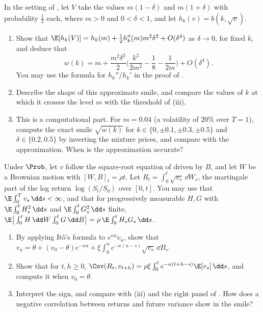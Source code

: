 \begin{exercise}\label{ex:iv-two-point}
\medium In the setting of , let $V$ take the values $m(1-\delta)$ and $m(1+\delta)$
with probability $\frac12$ each, where $m>0$ and $0<\delta<1$, and let $h_k(v)=b(k,\sqrt v)$.
\begin{enumerate}[label=(\alph*)]
  \item Show that $\E[h_k(V)]=h_k(m)+\frac12h_k''(m)m^2\delta^2+O(\delta^4)$ as $\delta\to0$, for fixed $k$, and
    deduce that
    \[
      w(k)=m+\frac{m^2\delta^2}2\Big(\frac{k^2}{2m^2}-\frac18-\frac1{2m}\Big)+O(\delta^4).
    \]
    You may use the formula for $h_k''/h_k'$ in the proof of .
  \item Describe the shape of this approximate smile, and compare the values of $k$ at which it crosses
    the level $m$ with the threshold of (iii).
  \item This is a computational part. For $m=0.04$ (a volatility of $20\%$ over $T=1$), compute the exact
    smile $\sqrt{w(k)}$ for $k\in\{0,\pm0.1,\pm0.3,\pm0.5\}$ and $\delta\in\{0.2,0.5\}$ by inverting the
    mixture prices, and compare with the approximation. When is the approximation accurate?
\end{enumerate}
\end{exercise}

\begin{exercise}\label{ex:iv-leverage}
\medium Under $\Prob$, let $v$ follow the square-root equation of  driven by $B$,
and let $W$ be a Brownian motion with $[W,B]_t=\rho t$. Let $R_t=\int_0^t\sqrt{v_s}\,\dd W_s$, the martingale
part of the log return $\log(S_t/S_0)$ over $[0,t]$. You may use that $\E\int_0^Tv_s\,\dd s<\infty$, and that
for progressively measurable $H,G$ with $\E\int_0^tH_s^2\,\dd s$ and $\E\int_0^tG_s^2\,\dd s$ finite,
$\E\big[\int_0^tH\,\dd W\int_0^tG\,\dd B\big]=\rho\,\E\int_0^tH_sG_s\,\dd s$.
\begin{enumerate}[label=(\alph*)]
  \item By applying It\^o's formula to $e^{\kappa u}v_u$, show that
    $v_u=\theta+(v_0-\theta)e^{-\kappa u}+\xi\int_0^ue^{-\kappa(u-s)}\sqrt{v_s}\,\dd B_s$.
  \item Show that for $t,h\ge0$, $\Cov(R_t,v_{t+h})=\rho\xi\int_0^te^{-\kappa(t+h-s)}\E[v_s]\,\dd s$, and compute it
    when $v_0=\theta$.
  \item Interpret the sign, and compare with (iii) and the right panel of
    . How does a negative correlation between returns and future variance show
    in the smile?
\end{enumerate}
\end{exercise}

